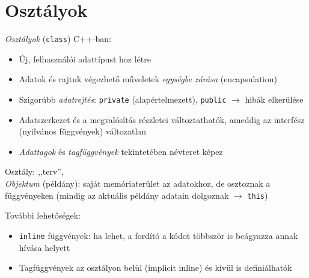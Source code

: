 \documentclass[usenames,dvipsnames,aspectratio=169]{beamer}
\begin{document}
\section{Osztályok}

\begin{frame}
    \emph{Osztályok} (\texttt{class}) C++-ban:
    \begin{itemize}
        \item Új, felhasználói adattípust hoz létre
        \item Adatok és rajtuk végezhető műveletek \emph{egységbe zárása} (encapsulation)
        \item Szigorúbb \emph{adatrejtés}: \texttt{private} (alapértelmezett), \texttt{public} $\to$ hibák elkerülése
        \item Adatszerkezet és a megvalósítás részletei változtathatók, ameddig az interfész (nyilvános függvények) változatlan
        \item \emph{Adattagok} és \emph{tagfüggvények} tekintetében névteret képez
    \end{itemize}
    \vfill
    Osztály: ,,terv'',  \\
    \emph{Objektum} (példány): saját memóriaterület az adatokhoz, de osztoznak a függvényeken (mindig az aktuális példány adatain dolgoznak $\to$ \texttt{this})
\end{frame}

\begin{frame}
    További lehetőségek:
    \begin{itemize}
        \item \texttt{inline} függvények: ha lehet, a fordító a kódot többször is beágyazza annak hívása helyett
        \item Tagfüggvények az osztályon belül (implicit inline) és kívül is definiálhatók
    \end{itemize}    
\end{frame}

\begin{frame}
    \begin{exampleblock}{}
        \footnotesize
        
    \end{exampleblock}
\end{frame}

\begin{frame}
    \begin{exampleblock}{}
        \small
        
    \end{exampleblock}
\end{frame}
\end{document}
